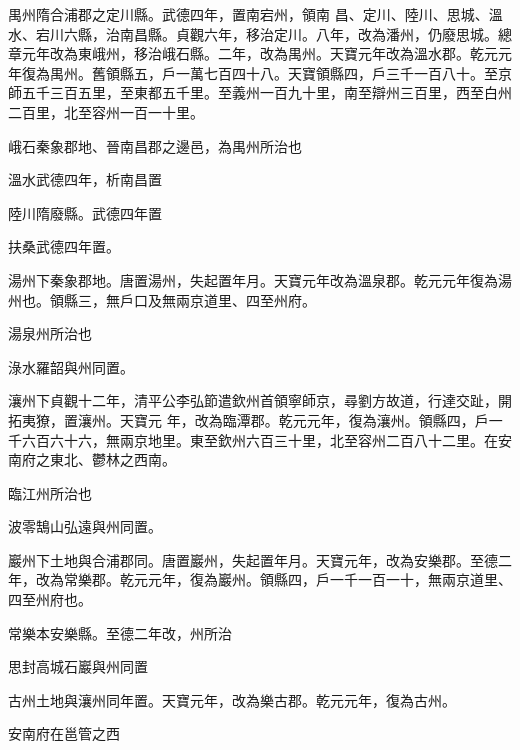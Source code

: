 \begin{pinyinscope}
 禺州隋合浦郡之定川縣。武德四年，置南宕州，領南
 昌、定川、陸川、思城、溫水、宕川六縣，治南昌縣。貞觀六年，移治定川。八年，改為潘州，仍廢思城。總章元年改為東峨州，移治峨石縣。二年，改為禺州。天寶元年改為溫水郡。乾元元年復為禺州。舊領縣五，戶一萬七百四十八。天寶領縣四，戶三千一百八十。至京師五千三百五里，至東都五千里。至義州一百九十里，南至辯州三百里，西至白州二百里，北至容州一百一十里。



 峨石秦象郡地、晉南昌郡之邊邑，為禺州所治也



 溫水武德四年，析南昌置



 陸川隋廢縣。武德四年置



 扶桑武德四年置。



 湯州下秦象郡地。唐置湯州，失起置年月。天寶元年改為溫泉郡。乾元元年復為湯州也。領縣三，無戶口及無兩京道里、四至州府。



 湯泉州所治也



 淥水羅韶與州同置。



 瀼州下貞觀十二年，清平公李弘節遣欽州首領寧師京，尋劉方故道，行達交趾，開拓夷獠，置瀼州。天寶元
 年，改為臨潭郡。乾元元年，復為瀼州。領縣四，戶一千六百六十六，無兩京地里。東至欽州六百三十里，北至容州二百八十二里。在安南府之東北、鬱林之西南。



 臨江州所治也



 波零鵠山弘遠與州同置。



 巖州下土地與合浦郡同。唐置巖州，失起置年月。天寶元年，改為安樂郡。至德二年，改為常樂郡。乾元元年，復為巖州。領縣四，戶一千一百一十，無兩京道里、四至州府也。



 常樂本安樂縣。至德二年改，州所治



 思封高城石巖與州同置



 古州土地與瀼州同年置。天寶元年，改為樂古郡。乾元元年，復為古州。



 安南府在邕管之西




\end{pinyinscope}
